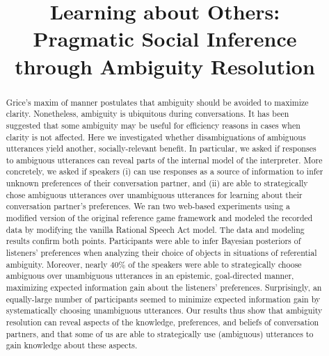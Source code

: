 \documentclass[10pt,a4paper]{article}
\title{Learning about Others:\\
	Pragmatic Social Inference \\ through Ambiguity Resolution
}
\begin{document}
\maketitle

\begin{abstract}
Grice's maxim of manner postulates that ambiguity should be avoided to maximize clarity.
Nonetheless, ambiguity is ubiquitous during conversations.
It has been suggested that some ambiguity may be useful for efficiency reasons in cases when clarity is not affected.
Here we investigated whether disambiguations of ambiguous utterances yield another, socially-relevant benefit.
In particular, we asked if responses to ambiguous utterances can reveal parts of the internal model of the interpreter. 
More concretely, we asked if speakers (i) can use responses as a source of information to infer unknown preferences of their conversation partner, and (ii) are able to strategically chose ambiguous utterances over unambiguous utterances for learning about their conversation partner's preferences. 
We ran two web-based experiments using a modified version of the original reference game framework \cite{frankgoodman2012} and modeled the recorded data by modifying the vanilla Rational Speech Act model.
The data and modeling results confirm both points. 
Participants were able to infer Bayesian posteriors of listeners' preferences when analyzing their choice of objects in situations of referential ambiguity.
Moreover, nearly 40\% of the speakers were able to strategically choose ambiguous over unambiguous utterances in an epistemic, goal-directed manner, maximizing expected information gain about the listeners' preferences.
Surprisingly, an equally-large number of participants seemed to minimize expected information gain by systematically choosing unambiguous utterances. 
Our results thus show that ambiguity resolution can reveal aspects of the knowledge, preferences, and beliefs of conversation partners, and that some of us are able to strategically use (ambiguous) utterances to gain knowledge about these aspects.

\end{abstract}
\end{document}
